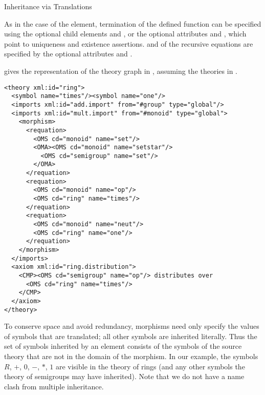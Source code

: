 \begin{omgroup}[id=complex-theories,short=Complex Theories,
                            creators=miko,contributors=frabe]
\begin{omgroup}[id=morphisms]{Inheritance via Translations}
\begin{module}[id=morphisms]
As in the case of the {} element, termination of the defined function
can be specified using the optional child elements {} and
{}, or the optional attributes {} and
{}, which point to uniqueness and existence
assertions. {} and {} of the
recursive equations are specified by the optional attributes
{} and {}.

{} gives the {\omdoc} representation of the theory graph in
{}, assuming the theories in {}.

\begin{lstlisting}[label=lst:rings,
  caption={A Theory of Rings by Inheritance Via Renaming},
  index={derive,method,premise}]
<theory xml:id="ring"> 
  <symbol name="times"/><symbol name="one"/> 
  <imports xml:id="add.import" from="#group" type="global"/>
  <imports xml:id="mult.import" from="#monoid" type="global"> 
    <morphism> 
      <requation> 
        <OMS cd="monoid" name="set"/>
        <OMA><OMS cd="monoid" name="setstar"/>
          <OMS cd="semigroup" name="set"/>
        </OMA>
      </requation> 
      <requation> 
        <OMS cd="monoid" name="op"/>
        <OMS cd="ring" name="times"/>
      </requation> 
      <requation>
        <OMS cd="monoid" name="neut"/>
        <OMS cd="ring" name="one"/>
      </requation> 
    </morphism> 
  </imports> 
  <axiom xml:id="ring.distribution"> 
    <CMP><OMS cd="semigroup" name="op"/> distributes over 
      <OMS cd="ring" name="times"/> 
    </CMP> 
  </axiom>
</theory>
\end{lstlisting}

To conserve space and avoid redundancy, {\omdoc} morphisms need only specify the values of
symbols that are translated; all other symbols are inherited literally.  Thus the set of
symbols inherited by an {} element consists of the symbols of the source
theory that are not in the domain of the morphism. In our example, the symbols $R$, $+$,
$0$, $-$, $*$, $1$ are visible in the theory of rings (and any other symbols the theory of
semigroups may have inherited). Note that we do not have a name clash from multiple
inheritance.
  

\end{module}
\end{omgroup}
\end{omgroup}
